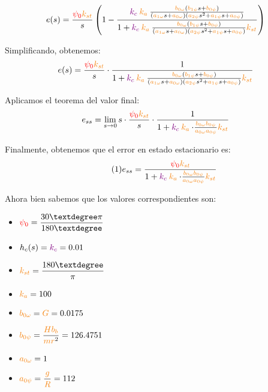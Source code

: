 \begin{equation}
  e(s) = \frac{\rojo{\psi_0}\nara{k_{st}}}{s} \left( 1 - \dfrac{\mora{k_c}\nara{k_a} \frac{\nara{\nara{b_{0\omega}}}\left(\nara{b_{1\psi}}s + \nara{b_{0\psi}}\right)}
  {\left(\nara{a_{1\omega}}s + \nara{a_{0\omega}}\right)\left(\nara{a_{2\psi}}s^{2} + \nara{a_{1\psi}}s + \nara{a_{0\psi}}\right)}}{1+\mora{k_c}\nara{k_a} \frac{\nara{\nara{b_{0\omega}}}\left(\nara{b_{1\psi}}s + \nara{b_{0\psi}}\right)}
{\left(\nara{a_{1\omega}}s + \nara{a_{0\omega}}\right)\left(\nara{a_{2\psi}}s^{2} + \nara{a_{1\psi}}s + \nara{a_{0\psi}}\right)}\nara{k_{st}}} \right)
\end{equation}


Simplificando, obtenemos:
\begin{equation}
  e(s) = \frac{\rojo{\psi_0}\nara{k_{st}}}{s} \cdot \frac{1}{1+\mora{k_c}\nara{k_a} \frac{\nara{\nara{b_{0\omega}}}\left(\nara{b_{1\psi}}s + \nara{b_{0\psi}}\right)}
  {\left(\nara{a_{1\omega}}s + \nara{a_{0\omega}}\right)\left(\nara{a_{2\psi}}s^{2} + \nara{a_{1\psi}}s + \nara{a_{0\psi}}\right)}\nara{k_{st}}}
\end{equation}


Aplicamos el teorema del valor final:
\begin{equation}
  e_{ss} = \lim_{s \to 0} s \cdot \frac{\rojo{\psi_0}\nara{k_{st}}}{s} \cdot \frac{1}{1 + \mora{k_c}\nara{k_a} \cdot \frac{\nara{b_{0\omega}b_{0\psi}}}{\nara{a_{0\omega}a_{0\psi}}} \nara{k_{st}}}
\end{equation}


Finalmente, obtenemos que el error en estado estacionario es:
\begin{equation} \tag{1} \label{eq:e_ss_symbolic}
  e_{ss} = \frac{\rojo{\psi_0}\nara{k_{st}}}{1 + \mora{k_c}\nara{k_a} \cdot \frac{\nara{b_{0\omega}b_{0\psi}}}{\nara{a_{0\omega}a_{0\psi}}} \nara{k_{st}}}
\end{equation}

Ahora bien sabemos que los valores correspondientes son:
\begin{multicols}{3}
  \begin{itemize}
    \item \( \rojo{\psi_0} = \displaystyle\frac{30° \pi}{180°} \)
    \item \(h_c(s) = \mathbin{\color{violet}k_{c}} = 0.01\)
    \item \(\nara{k_{st}} = \displaystyle\frac{180°}{\pi}\)
    \item \(\nara{k_{a}} = 100 \)
    \item \(\nara{b_{0\omega}} = \nara{G} =0.0175 \)
    \item \(\nara{b_{0\psi}} = \displaystyle\frac{\nara{Hb_b}}{\nara{mr}^2} = 126.4751\)
    \item \(\nara{a_{0\omega}} = 1 \)
    \item \(\nara{a_{0\psi}} = \displaystyle\frac{\nara{g}}{\nara{R}} =112 \)
  \end{itemize}
\end{multicols}


